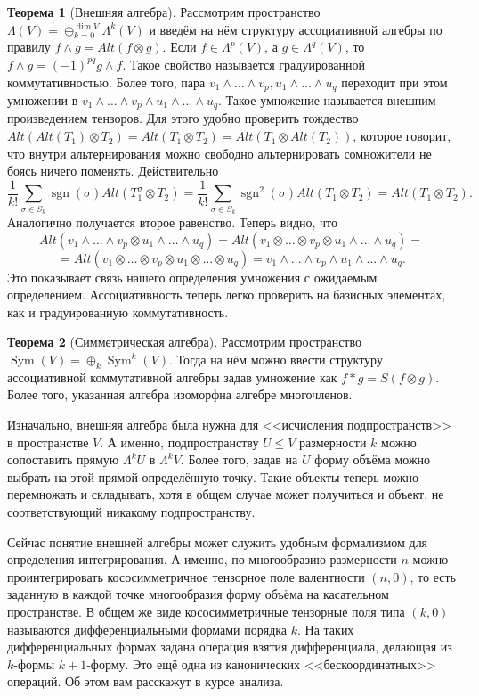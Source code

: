 \documentclass[10pt,a4paper,oneside]{book}
\theoremstyle{definition}
\newtheorem{thm}{\color{red!40!black}Теорема}
\renewcommand{\leq}{\leqslant}
\newcommand{\Sym}{\operatorname{Sym}}
\newcommand{\sgn}{\operatorname{sgn}}
\def\thrm{\begin{thm}}
\def\ethrm{\end{thm}}
\begin{document}
\thrm[Внешняя алгебра] Рассмотрим пространство $\Lambda(V)=\oplus_{k=0}^{\dim V} \Lambda^k(V)$ и введём на нём структуру ассоциативной алгебры по правилу $ f\wedge g= Alt(f\otimes g)$. Если $f\in \Lambda^p(V)$, а $g \in \Lambda^q(V)$, то $f\wedge g=(-1)^{pq}g \wedge f$. Такое свойство называется градуированной коммутативностью. Более того, пара $v_1 \wedge \dots \wedge v_p , u_1\wedge \dots \wedge u_q$ переходит при этом умножении в $v_1 \wedge \dots \wedge v_p \wedge u_1\wedge \dots \wedge u_q$. Такое умножение называется внешним произведением тензоров.
\proof Для этого удобно проверить тождество $Alt(Alt(T_1)\otimes T_2)= Alt(T_1\otimes T_2)= Alt(T_1 \otimes Alt(T_2))$, которое говорит, что внутри альтернирования можно свободно альтернировать сомножители не боясь ничего поменять. Действительно
$$\frac{1}{k!}\sum_{\sigma \in S_{k}}\sgn(\sigma) Alt(T_1^{\sigma}\otimes T_2)=\frac{1}{k!}\sum_{\sigma \in S_{k}} \sgn^2(\sigma) Alt(T_1\otimes T_2)=Alt(T_1 \otimes T_2).$$
Аналогично получается второе равенство. Теперь видно, что 
$$Alt(v_1 \wedge \dots \wedge v_p \otimes u_1\wedge \dots \wedge u_q)=Alt(v_1 \otimes \dots \otimes v_p \otimes u_1\wedge \dots \wedge u_q)=$$
$$=Alt( v_1 \otimes \dots \otimes v_p \otimes u_1\otimes \dots \otimes u_q) =v_1 \wedge \dots \wedge v_p  \wedge u_1\wedge \dots \wedge u_q .$$
Это показывает связь нашего определения умножения с ожидаемым определением. Ассоциативность теперь легко проверить на базисных элементах, как и градуированную коммутативность.
\endproof
\ethrm





\thrm[Симметрическая алгебра] Рассмотрим пространство $\Sym(V)=\oplus_k \Sym^k(V)$. Тогда на нём можно ввести структуру ассоциативной коммутативной алгебры задав умножение как $ f*g= S(f\otimes g)$. Более того, указанная алгебра изоморфна алгебре многочленов.
\ethrm



Изначально, внешняя алгебра была нужна для <<исчисления подпространств>> в пространстве $V$. А именно, подпространству $U\leq V$ размерности $k$ можно сопоставить прямую $\Lambda^k U$ в $\Lambda^k V$. Более того, задав на $U$ форму объёма можно выбрать на этой прямой определённую точку. Такие объекты теперь можно перемножать и складывать, хотя в общем случае может получиться и объект, не соответствующий никакому подпространству. 

Сейчас понятие внешней алгебры может служить удобным формализмом для определения интегрирования. А именно, по многообразию размерности $n$ можно проинтегрировать кососимметричное тензорное поле валентности $(n,0)$, то есть заданную в каждой точке многообразия форму объёма на касательном пространстве. В общем же виде кососимметричные тензорные поля типа $(k,0)$ называются дифференциальными формами порядка $k$. На таких дифференциальных формах задана операция взятия дифференциала, делающая из $k$-формы $k+1$-форму. Это ещё одна из канонических <<бескоординатных>> операций. Об этом вам расскажут в курсе анализа.
\end{document}
